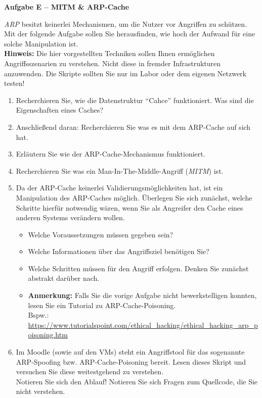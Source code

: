\documentclass[paper=a4,fontsize=11pt]{scrartcl}%
\numberwithin{equation}{section}
\begin{document}
\begin{center}\Large{\textbf{Aufgabe E -- MITM \& ARP-Cache}}\end{center}\vskip0.25in
\emph{ARP} besitzt keinerlei Mechanismen, um die Nutzer vor Angriffen zu schützen. Mit der folgende Aufgabe sollen Sie herausfinden, wie hoch der Aufwand für eine solche Manipulation ist.\\
\textbf{Hinweis:} Die hier vorgestellten Techniken sollen Ihnen ermöglichen Angriffsszenarien zu verstehen. Nicht diese in fremder Infrastrukturen anzuwenden. Die Skripte sollten Sie nur im Labor oder dem eigenen Netzwerk testen! 
\begin{enumerate}
	\item Recherchieren Sie, wie die Datenstruktur \enquote{Cahce} funktioniert. Was sind die Eigenschaften eines Caches?
	\item Anschließend daran: Recherchieren Sie was es mit dem ARP-Cache auf sich hat.
	\item Erläutern Sie wie der ARP-Cache-Mechanismus funktioniert.
	\item Recherchieren Sie was ein Man-In-The-Middle-Angriff (\emph{MITM}) ist.
	\item Da der ARP-Cache keinerlei Validierungsmöglichkeiten hat, ist ein Manipulation des ARP-Caches möglich. Überlegen Sie sich zunächst, welche Schritte hierfür notwendig wären, wenn Sie als Angreifer den Cache eines anderen Systems verändern wollen.
	\begin{itemize}
		\item Welche Voraussetzungen müssen gegeben sein?
		\item Welche Informationen über das Angriffsziel benötigen Sie?
		\item Welche Schritten müssen für den Angriff erfolgen. Denken Sie zunächst abstrakt darüber nach. 
		\item \textbf{Anmerkung:} Falls Sie die vorige Aufgabe nicht bewerkstelligen konnten, lesen Sie ein Tutorial zu ARP-Cache-Poisoning.\\
		Bspw.: \url{https://www.tutorialspoint.com/ethical_hacking/ethical_hacking_arp_poisoning.htm}
	\end{itemize}
	\item Im Moodle (sowie auf den VMs) steht ein Angriffstool für das sogenannte ARP-Spoofing bzw. ARP-Cache-Poisoning bereit. Lesen dieses Skript und versuchen Sie diese weitestgehend zu verstehen.\\
	Notieren Sie sich den Ablauf! Notieren Sie sich Fragen zum Quellcode, die Sie nicht verstehen.
\end{enumerate}



\end{document}
